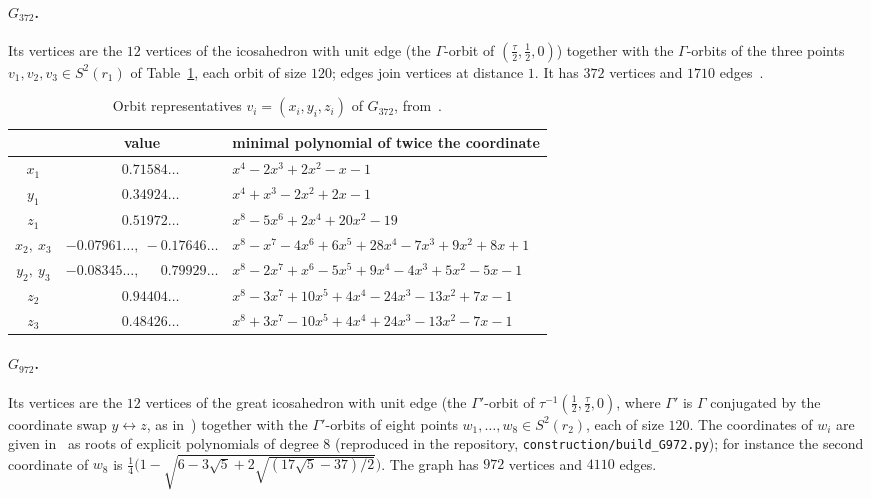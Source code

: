 \documentclass[11pt]{article}
\theoremstyle{remark}
\begin{document}
\paragraph{$G_{372}$.} Its vertices are the $12$ vertices of the icosahedron with unit edge (the
$\Gamma$-orbit of $(\frac{\tau}{2},\frac12,0)$) together with the $\Gamma$-orbits of the three points
$v_1,v_2,v_3\in S^2(r_1)$ of Table~\ref{tab:poly372}, each orbit of size $120$; edges join vertices at
distance $1$. It has $372$ vertices and $1710$ edges~\cite{VND2022}.

\begin{table}[ht]
\centering\small
\begin{tabular}{ccl}
\toprule
 & value & minimal polynomial of twice the coordinate \\
\midrule
$x_1$ & $\phantom{-}0.71584\ldots$ & $x^4-2x^3+2x^2-x-1$ \\
$y_1$ & $\phantom{-}0.34924\ldots$ & $x^4+x^3-2x^2+2x-1$ \\
$z_1$ & $\phantom{-}0.51972\ldots$ & $x^8-5x^6+2x^4+20x^2-19$ \\
$x_2,\ x_3$ & $-0.07961\ldots,\ -0.17646\ldots$ & $x^8-x^7-4x^6+6x^5+28x^4-7x^3+9x^2+8x+1$ \\
$y_2,\ y_3$ & $-0.08345\ldots,\ \phantom{-}0.79929\ldots$ & $x^8-2x^7+x^6-5x^5+9x^4-4x^3+5x^2-5x-1$ \\
$z_2$ & $\phantom{-}0.94404\ldots$ & $x^8-3x^7+10x^5+4x^4-24x^3-13x^2+7x-1$ \\
$z_3$ & $\phantom{-}0.48426\ldots$ & $x^8+3x^7-10x^5+4x^4+24x^3-13x^2-7x-1$ \\
\bottomrule
\end{tabular}
\caption{Orbit representatives $v_i=(x_i,y_i,z_i)$ of $G_{372}$, from~\cite{VND2022}.}
\label{tab:poly372}
\end{table}

\paragraph{$G_{972}$.} Its vertices are the $12$ vertices of the great icosahedron with unit edge (the
$\Gamma'$-orbit of $\tau^{-1}(\frac12,\frac{\tau}{2},0)$, where $\Gamma'$ is $\Gamma$ conjugated by the
coordinate swap $y\leftrightarrow z$, as in~\cite{VNDrepo}) together with the $\Gamma'$-orbits of eight
points $w_1,\dots,w_8\in S^2(r_2)$, each of size $120$. The coordinates of $w_i$ are given
in~\cite{VNDrepo} as roots of explicit polynomials of degree $8$ (reproduced in the repository, \texttt{construction/build\_G972.py});
for instance the second coordinate of $w_8$ is
$\frac14\bigl(1-\sqrt{6-3\sqrt5+2\sqrt{(17\sqrt5-37)/2}}\bigr)$. The graph has $972$ vertices and $4110$
edges.
\end{document}
